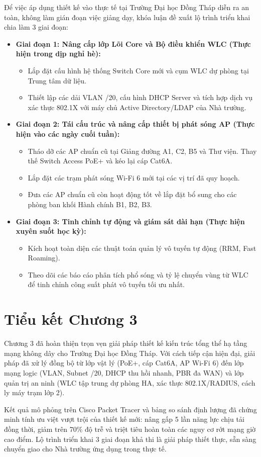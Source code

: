 Để việc áp dụng thiết kế vào thực tế tại Trường Đại học Đồng Tháp diễn ra an toàn, không làm gián đoạn việc giảng dạy, khóa luận đề xuất lộ trình triển khai chia làm 3 giai đoạn:
\begin{itemize}
    \item \textbf{Giai đoạn 1: Nâng cấp lớp Lõi Core và Bộ điều khiển WLC (Thực hiện trong dịp nghỉ hè):}
      \begin{itemize}
        \item Lắp đặt cấu hình hệ thống Switch Core mới và cụm WLC dự phòng tại Trung tâm dữ liệu.
        \item Thiết lập các dải VLAN /20, cấu hình DHCP Server và tích hợp dịch vụ xác thực 802.1X với máy chủ Active Directory/LDAP của Nhà trường.
      \end{itemize}
    \item \textbf{Giai đoạn 2: Tái cấu trúc và nâng cấp thiết bị phát sóng AP (Thực hiện vào các ngày cuối tuần):}
      \begin{itemize}
        \item Tháo dỡ các AP chuẩn cũ tại Giảng đường A1, C2, B5 và Thư viện. Thay thế Switch Access PoE+ và kéo lại cáp Cat6A.
        \item Lắp đặt các trạm phát sóng Wi-Fi 6 mới tại các vị trí đã quy hoạch.
        \item Đưa các AP chuẩn cũ còn hoạt động tốt về lắp đặt bổ sung cho các phòng ban khối Hành chính B1, B2, B3.
      \end{itemize}
    \item \textbf{Giai đoạn 3: Tinh chỉnh tự động và giám sát dài hạn (Thực hiện xuyên suốt học kỳ):}
      \begin{itemize}
        \item Kích hoạt toàn diện các thuật toán quản lý vô tuyến tự động (RRM, Fast Roaming).
        \item Theo dõi các báo cáo phân tích phổ sóng và tỷ lệ chuyển vùng từ WLC để tinh chỉnh công suất phát vô tuyến tối ưu nhất.
      \end{itemize}
\end{itemize}

\section{Tiểu kết Chương 3}

Chương 3 đã hoàn thiện trọn vẹn giải pháp thiết kế kiến trúc tổng thể hạ tầng mạng không dây cho Trường Đại học Đồng Tháp. Với cách tiếp cận hiện đại, giải pháp đã xử lý đồng bộ từ lớp vật lý (PoE+, cáp Cat6A, AP Wi-Fi 6) đến lớp mạng logic (VLAN, Subnet /20, DHCP thu hồi nhanh, PBR đa WAN) và lớp quản trị an ninh (WLC tập trung dự phòng HA, xác thực 802.1X/RADIUS, cách ly máy trạm lớp 2).

Kết quả mô phỏng trên Cisco Packet Tracer và bảng so sánh định lượng đã chứng minh tính ưu việt vượt trội của thiết kế mới: nâng gấp 5 lần năng lực chịu tải đồng thời, giảm trên 70\% độ trễ và triệt tiêu hoàn toàn các nguy cơ rớt mạng giờ cao điểm. Lộ trình triển khai 3 giai đoạn khả thi là giải pháp thiết thực, sẵn sàng chuyển giao cho Nhà trường ứng dụng trong thực tế.

